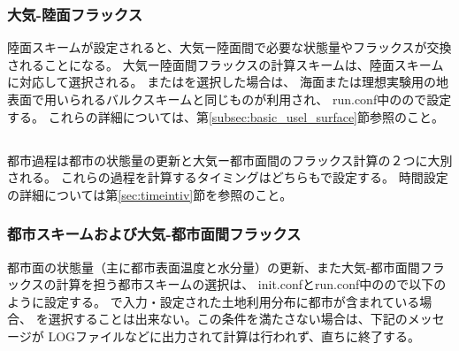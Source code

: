 \subsubsection{大気-陸面フラックス}
陸面スキームが設定されると、大気ー陸面間で必要な状態量やフラックスが交換されることになる。
大気ー陸面間フラックスの計算スキームは、陸面スキームに対応して選択される。
またはを選択した場合は、
海面または理想実験用の地表面で用いられるバルクスキームと同じものが利用され、
run.conf中のので設定する。
これらの詳細については、第\ref{subsec:basic_usel_surface}節参照のこと。\\



\subsection{\SubsecUrbanSetting} \label{subsec:basic_usel_urban}
都市過程は都市の状態量の更新と大気ー都市面間のフラックス計算の２つに大別される。
これらの過程を計算するタイミングはどちらもで設定する。
時間設定の詳細については第\ref{sec:timeintiv}節を参照のこと。\\

\subsubsection{都市スキームおよび大気-都市面間フラックス}
都市面の状態量（主に都市表面温度と水分量）の更新、また大気-都市面間フラックスの計算を担う都市スキームの選択は、
init.confとrun.conf中のので以下のように設定する。
で入力・設定された土地利用分布に都市が含まれている場合、
を選択することは出来ない。この条件を満たさない場合は、下記のメッセージが
LOGファイルなどに出力されて計算は行われず、直ちに終了する。

\\

